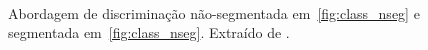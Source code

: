 \begin{figure}[ht!]
\label{fig:tipo_class}
\centering
{}\\
\caption[Abordagens de Discriminação.]{Abordagem de discriminação não-segmentada
em~\ref{fig:class_nseg} e segmentada em~\ref{fig:class_nseg}. Extraído de 
\cite{tese_eduardo}.}
\end{figure}

